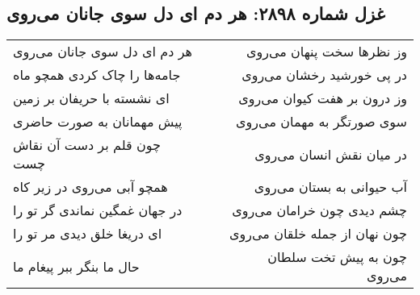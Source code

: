 \begin{center}
\section*{غزل شماره ۲۸۹۸: هر دم ای دل سوی جانان می‌روی}
\label{sec:2898}
\begin{longtable}{l p{0.5cm} r}
هر دم ای دل سوی جانان می‌روی
&&
وز نظرها سخت پنهان می‌روی
\\
جامه‌ها را چاک کردی همچو ماه
&&
در پی خورشید رخشان می‌روی
\\
ای نشسته با حریفان بر زمین
&&
وز درون بر هفت کیوان می‌روی
\\
پیش مهمانان به صورت حاضری
&&
سوی صورتگر به مهمان می‌روی
\\
چون قلم بر دست آن نقاش چست
&&
در میان نقش انسان می‌روی
\\
همچو آبی می‌روی در زیر کاه
&&
آب حیوانی به بستان می‌روی
\\
در جهان غمگین نماندی گر تو را
&&
چشم دیدی چون خرامان می‌روی
\\
ای دریغا خلق دیدی مر تو را
&&
چون نهان از جمله خلقان می‌روی
\\
حال ما بنگر ببر پیغام ما
&&
چون به پیش تخت سلطان می‌روی
\\
\end{longtable}
\end{center}
